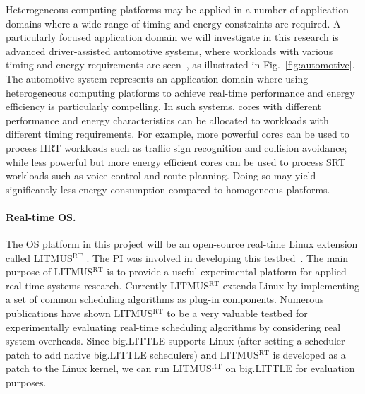 Heterogeneous computing platforms may be applied in a number of application domains where a wide range of timing and energy constraints are required. A particularly focused application domain we will investigate in this research is advanced driver-assisted automotive systems, where workloads with various timing and energy requirements are seen~\cite{elliott2011real}, as illustrated in Fig.~\ref{fig:automotive}.  
The automotive system represents an application domain where using heterogeneous computing platforms to achieve real-time performance and energy efficiency is particularly compelling. 
 In such systems, cores with different performance and energy characteristics can be allocated to workloads with different timing requirements. For example, more powerful cores can be used to process HRT workloads such as traffic sign recognition and collision avoidance; while less powerful but more energy efficient cores can be used to process SRT workloads such as voice control and route planning. Doing so may yield significantly less energy consumption compared to homogeneous platforms. %


\paragraph{Real-time OS.} The OS platform in this project will be an open-source real-time Linux extension called LITMUS$^{\textrm{RT}}$ \cite{LITMUS}. The PI was involved in developing this testbed~\cite{elliott1minimizing, Liudissertation}. The main purpose of LITMUS$^{\textrm{RT}}$ is to provide a useful experimental platform for applied real-time systems research. Currently LITMUS$^{\textrm{RT}}$ extends Linux by implementing a set of common scheduling algorithms as plug-in components. Numerous  publications \cite{elliott1minimizing, elliott1minimizing, Liudissertation, BBBdissertation, clustered, calandrino2008cache, johndissertation} have shown LITMUS$^{\textrm{RT}}$ to be a very valuable testbed for experimentally evaluating real-time scheduling algorithms by considering real system overheads. 
 Since big.LITTLE supports Linux (after setting a scheduler patch to add native big.LITTLE schedulers) and LITMUS$^{\textrm{RT}}$ is developed as a patch to the Linux kernel, we can run LITMUS$^{\textrm{RT}}$ on big.LITTLE for evaluation purposes.